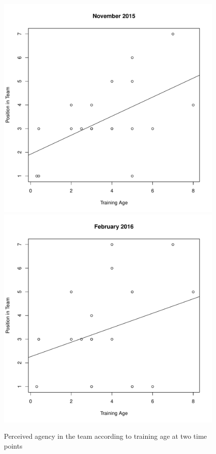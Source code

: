 \begin{CJK}{UTF8}{gbsn}
\begin{figure}[htbp]
  \centering
\includegraphics[scale=.3]{images/teamPosTrainingNov.pdf}
\includegraphics[scale=.3]{images/teamPosTrainingFeb.pdf}
  \caption{Perceived agency in the team according to training age at two time points}
  \label{fig:teamPositionTrainingAge}
\end{figure}


\end{CJK}
